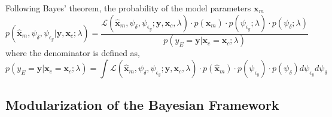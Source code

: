 Following Bayes' theorem, the probability of the model parameters $\bm{x}_m$
\begin{equation}
  p(\hat{\bm{x}}_m, \psi_\delta, \psi_{\epsilon_y} | \mathbf{y}, \mathbf{x}_c; \lambda) = \frac{\mathcal{L}(\hat{\bm{x}}_m, \psi_\delta, \psi_{\epsilon_y} ; \mathbf{y}, \mathbf{x}_c, \lambda) \cdot p(\hat{\bm{x}}_m) \cdot p(\psi_{\epsilon_y}; \lambda) \cdot p(\psi_{\delta}; \lambda)}{p(y_E = \mathbf{y} | \bm{x}_c = \mathbf{x}_c ; \lambda)}
\label{eq:bc_}
\end{equation}
where the denominator is defined as,
\begin{equation}
	p(y_E = \mathbf{y} | \bm{x}_c = \mathbf{x}_c ; \lambda) = \int \mathcal{L}(\hat{\bm{x}}_m, \psi_\delta, \psi_{\epsilon_y}; \mathbf{y}, \mathbf{x}_c, \lambda) \cdot p(\hat{\bm{x}}_m) \cdot p(\psi_{\epsilon_y}) \cdot p(\psi_{\delta}) d\psi_{\epsilon_y} d\psi_\delta
\label{eq:}
\end{equation}

\subsection{Modularization of the Bayesian Framework}\label{sub:bc_modularization}
